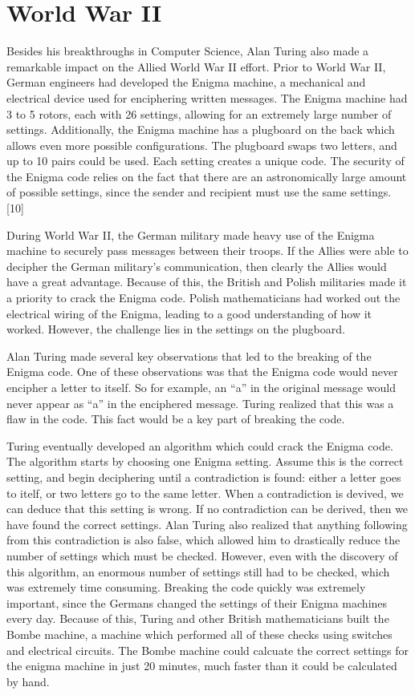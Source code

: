 \documentclass[12pt]{article}
\theoremstyle{mystyle}
\begin{document}
\section{World War II}


Besides his breakthroughs in Computer Science, Alan Turing also made a
remarkable impact on the Allied World War II effort. Prior to World War II,
German engineers had developed the Enigma machine, a mechanical and electrical 
device used for enciphering written messages. The Enigma machine had 3 to 5
rotors, each with 26 settings, allowing for an extremely large number of
settings. Additionally, the Enigma machine has a plugboard on the back which 
allows even more possible configurations. The plugboard swaps two letters, and 
up to 10 pairs could be used. Each setting creates a unique code. The security 
of the Enigma code relies on the fact that there are an astronomically large 
amount of possible settings, since the sender and recipient must use the same
settings. [10]

During World War II, the German military made heavy use of the Enigma machine to
securely pass messages between their troops. If the Allies were able to decipher
the German military's communication, then clearly the Allies would have a great
advantage. Because of this, the British and Polish militaries made it a priority
to crack the Enigma code. Polish mathematicians had worked out the electrical
wiring of the Enigma, leading to a good understanding of how it worked. 
However, the challenge lies in the settings on the plugboard.

Alan Turing made several key observations that led to the breaking of the Enigma
code. One of these observations was that the Enigma code would never encipher a 
letter to itself. So for example, an ``a'' in the original message would never
appear as ``a'' in the enciphered message. Turing realized that this was a flaw
in the code. This fact would be a key part of breaking the code.

Turing eventually developed an algorithm which could crack the Enigma code. The 
algorithm starts by choosing one Enigma setting. Assume this is the correct
setting, and begin deciphering until a contradiction is found: either a letter
goes to itelf, or two letters go to the same letter. When a contradiction is
devived, we can deduce that this setting is wrong. If no contradiction can
be derived, then we have found the correct settings. Alan Turing also realized
that anything following from this contradiction is also false, which allowed him
to drastically reduce the number of settings which must be checked. However,
even  with the discovery of this algorithm, an enormous number of settings still
had to be checked, which was extremely time consuming. Breaking the code quickly
was extremely important, since the Germans changed the settings of their Enigma 
machines every day. Because of this, Turing and other British mathematicians 
built the Bombe machine, a machine which performed all of these checks using 
switches and electrical circuits. The Bombe machine could calcuate the correct 
settings for the enigma machine in just 20 minutes, much faster than it could be
calculated by hand.
\end{document}
